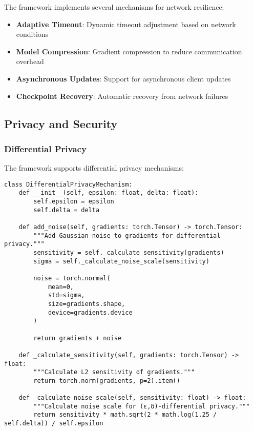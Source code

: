 The framework implements several mechanisms for network resilience:

\begin{itemize}
    \item \textbf{Adaptive Timeout}: Dynamic timeout adjustment based on network conditions
    \item \textbf{Model Compression}: Gradient compression to reduce communication overhead
    \item \textbf{Asynchronous Updates}: Support for asynchronous client updates
    \item \textbf{Checkpoint Recovery}: Automatic recovery from network failures
\end{itemize}

\subsection{Privacy and Security}

\subsubsection{Differential Privacy}

The framework supports differential privacy mechanisms:

\begin{lstlisting}[style=pythoncode, caption=Differential Privacy Implementation]
class DifferentialPrivacyMechanism:
    def __init__(self, epsilon: float, delta: float):
        self.epsilon = epsilon
        self.delta = delta
        
    def add_noise(self, gradients: torch.Tensor) -> torch.Tensor:
        """Add Gaussian noise to gradients for differential privacy."""
        sensitivity = self._calculate_sensitivity(gradients)
        sigma = self._calculate_noise_scale(sensitivity)
        
        noise = torch.normal(
            mean=0, 
            std=sigma, 
            size=gradients.shape,
            device=gradients.device
        )
        
        return gradients + noise
    
    def _calculate_sensitivity(self, gradients: torch.Tensor) -> float:
        """Calculate L2 sensitivity of gradients."""
        return torch.norm(gradients, p=2).item()
    
    def _calculate_noise_scale(self, sensitivity: float) -> float:
        """Calculate noise scale for (ε,δ)-differential privacy."""
        return sensitivity * math.sqrt(2 * math.log(1.25 / self.delta)) / self.epsilon
\end{lstlisting}

